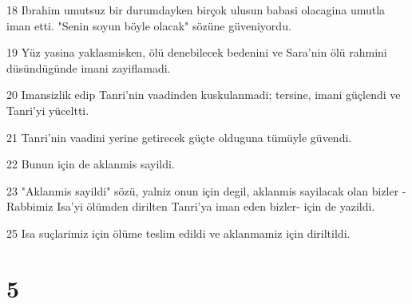 \par 18 Ibrahim umutsuz bir durumdayken birçok ulusun babasi olacagina umutla iman etti. "Senin soyun böyle olacak" sözüne güveniyordu.
\par 19 Yüz yasina yaklasmisken, ölü denebilecek bedenini ve Sara'nin ölü rahmini düsündügünde imani zayiflamadi.
\par 20 Imansizlik edip Tanri'nin vaadinden kuskulanmadi; tersine, imani güçlendi ve Tanri'yi yüceltti.
\par 21 Tanri'nin vaadini yerine getirecek güçte olduguna tümüyle güvendi.
\par 22 Bunun için de aklanmis sayildi.
\par 23 "Aklanmis sayildi" sözü, yalniz onun için degil, aklanmis sayilacak olan bizler -Rabbimiz Isa'yi ölümden dirilten Tanri'ya iman eden bizler- için de yazildi.
\par 25 Isa suçlarimiz için ölüme teslim edildi ve aklanmamiz için diriltildi.

\chapter{5}

